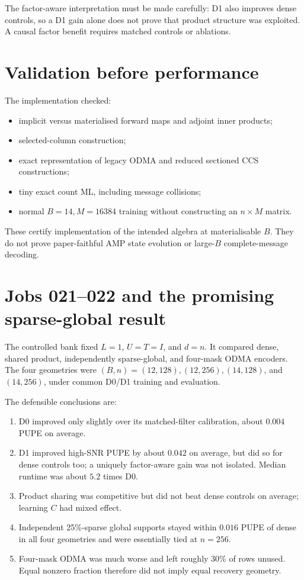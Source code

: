 \documentclass[11pt]{article}
\begin{document}
The factor-aware interpretation must be made carefully: D1 also improves dense controls, so a D1 gain alone does not
prove that product structure was exploited. A causal factor benefit requires matched controls or ablations.

\section{Validation before performance}

The implementation checked:
\begin{itemize}
 \item implicit versus materialised forward maps and adjoint inner products;
 \item selected-column construction;
 \item exact representation of legacy ODMA and reduced sectioned CCS constructions;
 \item tiny exact count ML, including message collisions;
 \item normal $B=14,M=16384$ training without constructing an $n\times M$ matrix.
\end{itemize}
These certify implementation of the intended algebra at materialisable $B$. They do not prove paper-faithful AMP state
evolution or large-$B$ complete-message decoding.

\section{Jobs 021--022 and the promising sparse-global result}

The controlled bank fixed $L=1$, $U=T=I$, and $d=n$. It compared dense, shared product, independently sparse-global,
and four-mask ODMA encoders. The four geometries were $(B,n)=(12,128),(12,256),(14,128)$, and $(14,256)$, under common
D0/D1 training and evaluation.

The defensible conclusions are:
\begin{enumerate}
 \item D0 improved only slightly over its matched-filter calibration, about $0.004$ PUPE on average.
 \item D1 improved high-SNR PUPE by about $0.042$ on average, but did so for dense controls too; a uniquely factor-aware
 gain was not isolated. Median runtime was about $5.2$ times D0.
 \item Product sharing was competitive but did not beat dense controls on average; learning $C$ had mixed effect.
 \item Independent 25\%-sparse global supports stayed within $0.016$ PUPE of dense in all four geometries and were
 essentially tied at $n=256$.
 \item Four-mask ODMA was much worse and left roughly 30\% of rows unused. Equal nonzero fraction therefore did not
 imply equal recovery geometry.
\end{enumerate}
\end{document}
